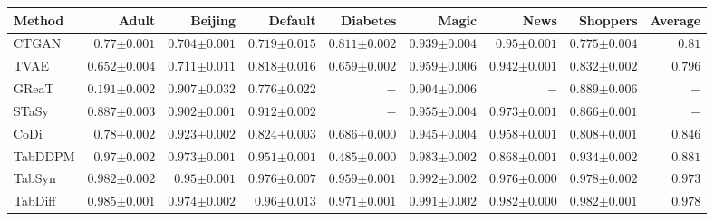 \begin{tabular}{lrrrrrrr|r}
    \toprule[0.8pt]
     \textbf{Method} & \textbf{Adult} & \textbf{Beijing} & \textbf{Default} & \textbf{Diabetes} & \textbf{Magic} & \textbf{News} & \textbf{Shoppers} & \textbf{Average} \\
    \midrule 
    CTGAN & $0.77${\tiny${\pm 0.001}$} & $0.704${\tiny${\pm 0.001}$} & $0.719${\tiny${\pm 0.015}$} & $0.811${\tiny${\pm 0.002}$} & $0.939${\tiny${\pm 0.004}$} & $0.95${\tiny${\pm 0.001}$} & $0.775${\tiny${\pm 0.004}$} & $0.81$ \\
    TVAE & $0.652${\tiny${\pm 0.004}$} & $0.711${\tiny${\pm 0.011}$} & $0.818${\tiny${\pm 0.016}$} & $0.659${\tiny${\pm 0.002}$} & $0.959${\tiny${\pm 0.006}$} & $0.942${\tiny${\pm 0.001}$} & $0.832${\tiny${\pm 0.002}$} & $0.796$ \\
    GReaT & $0.191${\tiny${\pm 0.002}$} & $0.907${\tiny${\pm 0.032}$} & $0.776${\tiny${\pm 0.022}$} & $-$ & $0.904${\tiny${\pm 0.006}$} & $-$ & $0.889${\tiny${\pm 0.006}$} & $-$ \\
    STaSy & $0.887${\tiny${\pm 0.003}$} & $0.902${\tiny${\pm 0.001}$} & $0.912${\tiny${\pm 0.002}$} & $-$ & $0.955${\tiny${\pm 0.004}$} & $0.973${\tiny${\pm 0.001}$} & $0.866${\tiny${\pm 0.001}$} & $-$ \\
    CoDi & $0.78${\tiny${\pm 0.002}$} & $0.923${\tiny${\pm 0.002}$} & $0.824${\tiny${\pm 0.003}$} & $0.686${\tiny${\pm 0.000}$} & $0.945${\tiny${\pm 0.004}$} & $0.958${\tiny${\pm 0.001}$} & $0.808${\tiny${\pm 0.001}$} & $0.846$ \\
    TabDDPM & $0.97${\tiny${\pm 0.002}$} & $0.973${\tiny${\pm 0.001}$} & $0.951${\tiny${\pm 0.001}$} & $0.485${\tiny${\pm 0.000}$} & $0.983${\tiny${\pm 0.002}$} & $0.868${\tiny${\pm 0.001}$} & $0.934${\tiny${\pm 0.002}$} & $0.881$ \\    
    TabSyn & $0.982${\tiny${\pm 0.002}$} & $0.95${\tiny${\pm 0.001}$} & $0.976${\tiny${\pm 0.007}$} & $0.959${\tiny${\pm 0.001}$} & $0.992${\tiny${\pm 0.002}$} & $0.976${\tiny${\pm 0.000}$} & $0.978${\tiny${\pm 0.002}$} & $0.973$ \\
    TabDiff & $0.985${\tiny${\pm 0.001}$} & $0.974${\tiny${\pm 0.002}$} & $0.96${\tiny${\pm 0.013}$} & $0.971${\tiny${\pm 0.001}$} & $0.991${\tiny${\pm 0.002}$} & $0.982${\tiny${\pm 0.000}$} & $0.982${\tiny${\pm 0.001}$} & $0.978$ \\

\end{tabular}
